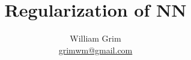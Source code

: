 \documentclass{article}
\begin{document}
\title {Regularization of NN}
\author{William Grim \\ \href{mailto:grimwm@gmail.com}{grimwm@gmail.com}}

\maketitle
\end{document}
